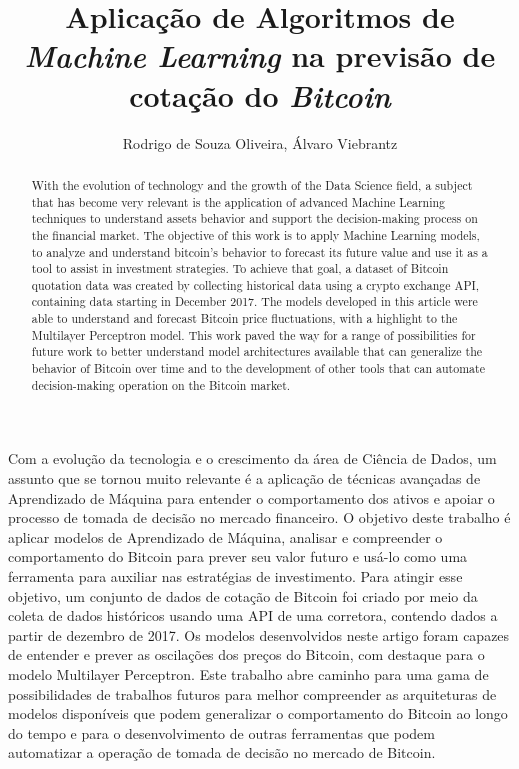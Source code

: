 \documentclass[12pt]{article}
\title{
  Aplicação de Algoritmos de \textit{Machine Learning} na previsão de cotação do
  \textit{Bitcoin}
}
\author{
  Rodrigo de Souza Oliveira\inst{1}, 
  Álvaro Viebrantz \inst{1}
}
\begin{document}
 

\maketitle

\begin{abstract}
With the evolution of technology and the growth of the Data Science field, a subject that has become very relevant is the application of advanced Machine Learning techniques to understand assets behavior and support the decision-making process on the financial market. 
The objective of this work is to apply Machine Learning models, to analyze and understand bitcoin’s behavior to forecast its future value and use it as a tool to assist in investment strategies.
To achieve that goal, a dataset of Bitcoin quotation data was created by collecting historical data using a crypto exchange API, containing data starting in December 2017.
The models developed in this article were able to understand and forecast Bitcoin price fluctuations, with a highlight to the Multilayer Perceptron model. This work paved the way for a range of possibilities for future work to better understand model architectures available that can generalize the behavior of Bitcoin over time and to the development of other tools that can automate decision-making operation on the Bitcoin market.
\end{abstract}
     
\begin{resumo} 
Com a evolução da tecnologia e o crescimento da área de Ciência de Dados, um assunto que se tornou muito relevante é a aplicação de técnicas avançadas de Aprendizado de Máquina para entender o comportamento dos ativos e apoiar o processo de tomada de decisão no mercado financeiro. O objetivo deste trabalho é aplicar modelos de Aprendizado de Máquina, analisar e compreender o comportamento do Bitcoin para prever seu valor futuro e usá-lo como uma ferramenta para auxiliar nas estratégias de investimento.
Para atingir esse objetivo, um conjunto de dados de cotação de Bitcoin foi criado por meio da coleta de dados históricos usando uma API de uma corretora, contendo dados a partir de dezembro de 2017.
Os modelos desenvolvidos neste artigo foram capazes de entender e prever as oscilações dos preços do Bitcoin, com destaque para o modelo Multilayer Perceptron. Este trabalho abre caminho para uma gama de possibilidades de trabalhos futuros para melhor compreender as arquiteturas de modelos disponíveis que podem generalizar o comportamento do Bitcoin ao longo do tempo e para o desenvolvimento de outras ferramentas que podem automatizar a operação de tomada de decisão no mercado de Bitcoin.
\end{resumo}
\end{document}
